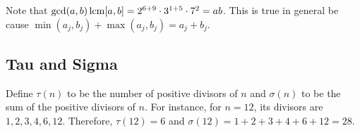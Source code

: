 Note that $\gcd(a,b)\operatorname{lcm}[a,b]=2^{6+9}\cdot 3^{1+5}\cdot 7^2=ab$. This is true in general be cause $\min(a_j, b_j)+\max(a_j, b_j)=a_j+b_j$. 

\clearpage

\subsection{Tau and Sigma}

\begin{defi} Define $\tau(n)$ to be the number of positive divisors of $n$ and $\sigma(n)$ to be the sum of the positive divisors of $n$. For instance, for $n=12$, its divisors are $1, 2, 3, 4, 6, 12$. Therefore, $\tau(12)=6$ and $\sigma(12)=1+2+3+4+6+12=28$. \end{defi}


\clearpage

